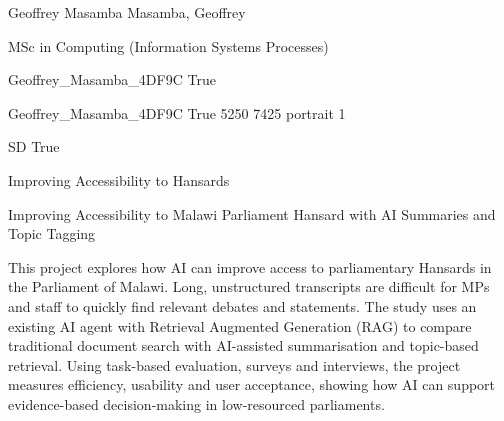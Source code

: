 
\begingroup{}\relax



\def\Key{Geoffrey_Masamba_4DF9C}

{Geoffrey Masamba}
{Masamba, Geoffrey}

{MSc in Computing (Information Systems Processes)}

{Geoffrey_Masamba_4DF9C}
{True}

{Geoffrey_Masamba_4DF9C}
{True}
{5250}
{7425}
{portrait}
{1}

{SD}
{True}

{Improving Accessibility to Hansards}

{Improving Accessibility to Malawi Parliament Hansard with AI Summaries and Topic Tagging}

{This project explores how AI can improve access to parliamentary Hansards in the Parliament of Malawi. Long, unstructured transcripts are difficult for MPs and staff to quickly find relevant debates and statements. The study uses an existing AI agent with Retrieval Augmented Generation (RAG) to compare traditional document search with AI-assisted summarisation and topic-based retrieval. Using task-based evaluation, surveys and interviews, the project measures efficiency, usability and user acceptance, showing how AI can support evidence-based decision-making in low-resourced parliaments.}

